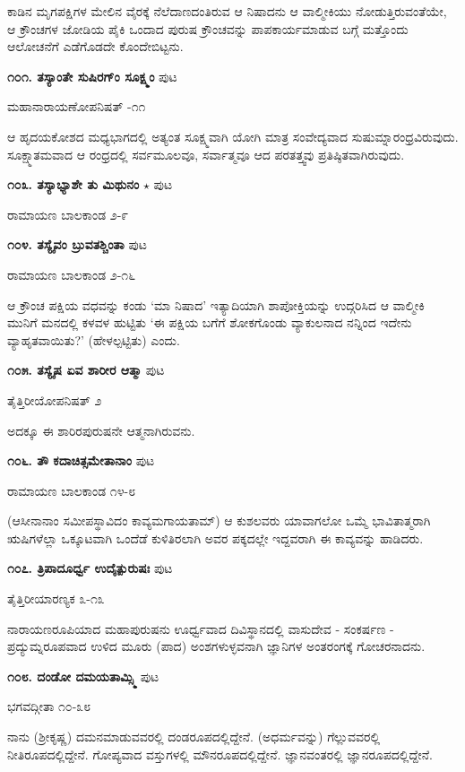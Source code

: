 ಕಾಡಿನ ಮೃಗಪಕ್ಷಿಗಳ ಮೇಲಿನ ವೈರಕ್ಕೆ ನೆಲೆದಾಣದಂತಿರುವ ಆ ನಿಷಾದನು ಆ ವಾಲ್ಮೀಕಿಯು ನೋಡುತ್ತಿರುವಂತೆಯೇ, ಆ ಕ್ರೌಂಚಗಳ ಜೋಡಿಯ ಪೈಕಿ ಒಂದಾದ ಪುರುಷ ಕ್ರೌಂಚವನ್ನು ಪಾಪಕಾರ್ಯಮಾಡುವ ಬಗ್ಗೆ ಮತ್ತೊಂದು ಆಲೋಚನೆಗೆ ಎಡೆಗೊಡದೇ ಕೊಂದೇಬಿಟ್ಟನು.

\medskip
\noindent\textbf{೧೦೧. ತಸ್ಯಾಂತೇ ಸುಷಿರಗ್ಂ ಸೂಕ್ಷ್ಮಂ} \hfill ಪುಟ \pageref{27}

\hfill ಮಹಾನಾರಾಯಣೋಪನಿಷತ್ -೧೧

ಆ ಹೃದಯಕೋಶದ ಮಧ್ಯಭಾಗದಲ್ಲಿ ಅತ್ಯಂತ ಸೂಕ್ಷ್ಮವಾಗಿ ಯೋಗಿ ಮಾತ್ರ ಸಂವೇದ್ಯವಾದ ಸುಷುಮ್ನಾರಂಧ್ರವಿರುವುದು. ಸೂಕ್ಷ್ಮಾತಮವಾದ ಆ ರಂಧ್ರದಲ್ಲಿ ಸರ್ವಮೂಲವೂ, ಸರ್ವಾತ್ಮವೂ ಆದ ಪರತತ್ತ್ವವು ಪ್ರತಿಷ್ಠಿತವಾಗಿರುವುದು.

\medskip
\noindent\textbf{೧೦೩. ತಸ್ಯಾಭ್ಯಾಶೇ ತು ಮಿಥುನಂ} $\star$ \hfill ಪುಟ \pageref{156-198}

\hfill ರಾಮಾಯಣ ಬಾಲಕಾಂಡ ೨-೯

\medskip
\noindent\textbf{೧೦೪. ತಸ್ಯೈವಂ ಬ್ರುವತಶ್ಚಿಂತಾ} \hfill ಪುಟ \pageref{201}

\hfill ರಾಮಾಯಣ ಬಾಲಕಾಂಡ ೨-೧೬

ಆ ಕ್ರೌಂಚ ಪಕ್ಷಿಯ ವಧವನ್ನು ಕಂಡು `ಮಾ ನಿಷಾದ' ಇತ್ಯಾದಿಯಾಗಿ ಶಾಪೋಕ್ತಿಯನ್ನು ಉದ್ಗರಿಸಿದ ಆ ವಾಲ್ಮೀಕಿ ಮುನಿಗೆ ಮನದಲ್ಲಿ ಕಳವಳ ಹುಟ್ಟಿತು `ಈ ಪಕ್ಷಿಯ ಬಗೆಗೆ ಶೋಕಗೊಂಡು ವ್ಯಾಕುಲನಾದ ನನ್ನಿಂದ ಇದೇನು ವ್ಯಾಹೃತವಾಯಿತು?' (ಹೇಳಲ್ಪಟ್ಟಿತು) ಎಂದು.

\medskip
\noindent\textbf{೧೦೫. ತಸ್ಯೈಷ ಏವ ಶಾರೀರ ಆತ್ಮಾ} \hfill ಪುಟ \pageref{76}

\hfill ತೈತ್ತಿರೀಯೋಪನಿಷತ್ ೨

ಅದಕ್ಕೂ ಈ ಶಾರಿರಪುರುಷನೇ ಆತ್ಮನಾಗಿರುವನು.

\medskip
\noindent\textbf{೧೦೬. ತೌ ಕದಾಚಿತ್ಸಮೇತಾನಾಂ} \hfill ಪುಟ \pageref{189}

\hfill ರಾಮಾಯಣ ಬಾಲಕಾಂಡ ೧೪-೮

(ಆಸೀನಾನಾಂ ಸಮೀಪಸ್ಥಾವಿದಂ ಕಾವ್ಯಮಗಾಯತಾಮ್) ಆ ಕುಶಲವರು ಯಾವಾಗಲೋ ಒಮ್ಮೆ ಭಾವಿತಾತ್ಮರಾಗಿ ಋಷಿಗಳೆಲ್ಲಾ ಒಕ್ಕೂಟವಾಗಿ ಒಂದೆಡೆ ಕುಳಿತಿರಲಾಗಿ ಅವರ ಪಕ್ಕದಲ್ಲೇ ಇದ್ದವರಾಗಿ ಈ ಕಾವ್ಯವನ್ನು ಹಾಡಿದರು.

\medskip
\noindent\textbf{೧೦೭. ತ್ರಿಪಾದೂರ್ಧ್ವ ಉದೈತ್ಪುರುಷಃ} \hfill ಪುಟ \pageref{252}

\hfill ತೈತ್ತಿರೀಯಾರಣ್ಯಕ ೩-೧೩

ನಾರಾಯಣರೂಪಿಯಾದ ಮಹಾಪುರುಷನು ಊರ್ಧ್ವವಾದ ದಿವಿಸ್ಥಾನದಲ್ಲಿ ವಾಸುದೇವ - ಸಂಕರ್ಷಣ - ಪ್ರದ್ಯುಮ್ನರೂಪವಾದ ಉಳಿದ ಮೂರು (ಪಾದ) ಅಂಶಗಳುಳ್ಳವನಾಗಿ ಜ್ಞಾನಿಗಳ ಅಂತರಂಗಕ್ಕೆ ಗೋಚರನಾದನು. 

\medskip
\noindent\textbf{೧೦೮. ದಂಡೋ ದಮಯತಾಮ್ಸ್ಮಿ} \hfill ಪುಟ \pageref{93}

\hfill ಭಗವದ್ಗೀತಾ ೧೦-೩೮

ನಾನು (ಶ್ರೀಕೃಷ್ಣ) ದಮನಮಾಡುವವರಲ್ಲಿ ದಂಡರೂಪದಲ್ಲಿದ್ದೇನೆ. (ಅಧರ್ಮವನ್ನು) ಗೆಲ್ಲುವವರಲ್ಲಿ ನೀತಿರೂಪದಲ್ಲಿದ್ದೇನೆ. ಗೋಪ್ಯವಾದ ವಸ್ತುಗಳಲ್ಲಿ ಮೌನರೂಪದಲ್ಲಿದ್ದೇನೆ. ಜ್ಞಾನವಂತರಲ್ಲಿ ಜ್ಞಾನರೂಪದಲ್ಲಿದ್ದೇನೆ.

